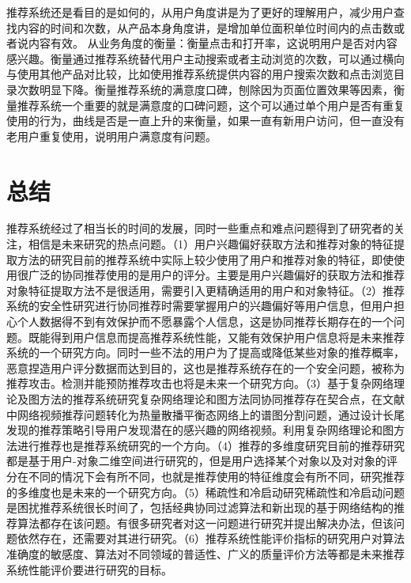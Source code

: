   推荐系统还是看目的是如何的，从用户角度讲是为了更好的理解用户，减少用户查找内容的时间和次数，从产品本身角度讲，是增加单位面积单位时间内的点击数或者说内容有效。 从业务角度的衡量：衡量点击和打开率，这说明用户是否对内容感兴趣。衡量通过推荐系统替代用户主动搜索或者主动浏览的次数，可以通过横向与使用其他产品对比较，比如使用推荐系统提供内容的用户搜索次数和点击浏览目录次数明显下降。衡量推荐系统的满意度口碑，刨除因为页面位置效果等因素，衡量推荐系统一个重要的就是满意度的口碑问题，这个可以通过单个用户是否有重复使用的行为，曲线是否是一直上升的来衡量，如果一直有新用户访问，但一直没有老用户重复使用，说明用户满意度有问题。

  \section{总结}
  推荐系统经过了相当长的时间的发展，同时一些重点和难点问题得到了研究者的关注，相信是未来研究的热点问题。（1）用户兴趣偏好获取方法和推荐对象的特征提取方法的研究目前的推荐系统中实际上较少使用了用户和推荐对象的特征，即使使用很广泛的协同推荐使用的是用户的评分。主要是用户兴趣偏好的获取方法和推荐对象特征提取方法不是很适用，需要引入更精确适用的用户和对象特征。（2）推荐系统的安全性研究进行协同推荐时需要掌握用户的兴趣偏好等用户信息，但用户担心个人数据得不到有效保护而不愿暴露个人信息，这是协同推荐长期存在的一个问题。既能得到用户信息而提高推荐系统性能，又能有效保护用户信息将是未来推荐系统的一个研究方向。同时一些不法的用户为了提高或降低某些对象的推荐概率，恶意捏造用户评分数据而达到目的，这也是推荐系统存在的一个安全问题，被称为推荐攻击。检测并能预防推荐攻击也将是未来一个研究方向。（3）基于复杂网络理论及图方法的推荐系统研究复杂网络理论和图方法同协同推荐存在契合点，在文献中网络视频推荐问题转化为热量散播平衡态网络上的谱图分割问题，通过设计长尾发现的推荐策略引导用户发现潜在的感兴趣的网络视频。利用复杂网络理论和图方法进行推荐也是推荐系统研究的一个方向。（4）推荐的多维度研究目前的推荐研究都是基于用户-对象二维空间进行研究的，但是用户选择某个对象以及对对象的评分在不同的情况下会有所不同，也就是推荐使用的特征维度会有所不同，研究推荐的多维度也是未来的一个研究方向。（5）稀疏性和冷启动研究稀疏性和冷启动问题是困扰推荐系统很长时间了，包括经典协同过滤算法和新出现的基于网络结构的推荐算法都存在该问题。有很多研究者对这一问题进行研究并提出解决办法，但该问题依然存在，还需要对其进行研究。（6）推荐系统性能评价指标的研究用户对算法准确度的敏感度、算法对不同领域的普适性、广义的质量评价方法等都是未来推荐系统性能评价要进行研究的目标。
